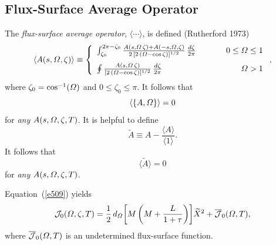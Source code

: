 \documentclass[notitlepage,12pt]{article}
\begin{document}
\subsection{Flux-Surface Average Operator}
The {\em flux-surface average operator}, $\langle\cdots\rangle$, is defined (Rutherford 1973)
\begin{equation}
\langle A(s,{\mit\Omega},\zeta)\rangle
\equiv \left\{
\begin{array}{llr}
\int_{\zeta_0}^{2\pi-\zeta_0}\frac{A(s,{\mit\Omega}\,\zeta)+A(-s,{\mit\Omega},\zeta)}{2\,[2\,({\mit\Omega}-\cos\zeta)]^{1/2}}\,\frac{d\zeta}{2\pi}&~~~~~&0\leq {\mit\Omega}\leq 1\\[2ex]
\oint \frac{A(s,{\mit\Omega}\,\zeta)}{[2\,({\mit\Omega}-\cos\zeta)]^{1/2}}\,\frac{d\zeta}{2\pi}
&&{\mit\Omega}> 1
\end{array}
\right.,
\end{equation}
where $\zeta_0=\cos^{-1}({\mit\Omega})$ and $0\leq\zeta_0\leq\pi$. 
It follows that
\begin{equation}\label{e5111}
\langle\{A,{\mit\Omega}\}\rangle = 0
\end{equation}
for {\em any}\/ $A(s,{\mit\Omega},\zeta,T)$. It is helpful to define
\begin{equation}
\tilde{A}  \equiv A - \frac{\langle A\rangle}{\langle 1\rangle}.
\end{equation}
It follows that 
\begin{equation}\label{e512}
\langle \tilde{A}\rangle =0
\end{equation}
 for {\em any}\/ $A(s,{\mit\Omega},\zeta,T)$.

Equation~(\ref{e509}) yields 
\begin{equation}\label{e513}
{\cal J}_0({\mit\Omega},\zeta,T)= 
\frac{1}{2}\,d_{\mit\Omega}\!\left[M\left(M+\frac{L}{1+\tau}\right)\right]\!\widetilde{X}^2 + \overline{\cal J}_0({\mit\Omega},T),
\end{equation}
where $\overline{{\cal J}}_0({\mit\Omega},T)$ is an undetermined flux-surface function. 
\end{document}
